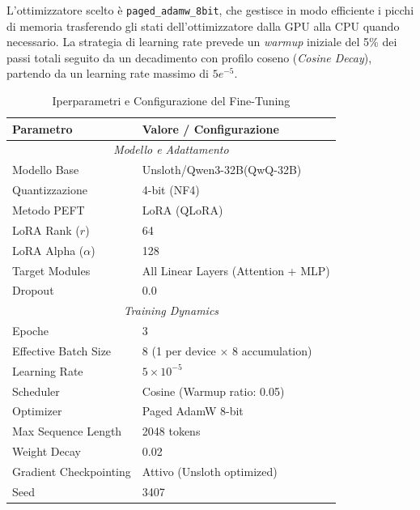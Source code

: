 L'ottimizzatore scelto è \texttt{paged\_adamw\_8bit}, che gestisce in modo efficiente i picchi di memoria trasferendo gli stati dell'ottimizzatore dalla GPU alla CPU quando necessario. La strategia di learning rate prevede un \textit{warmup} iniziale del 5\% dei passi totali seguito da un decadimento con profilo coseno (\textit{Cosine Decay}), partendo da un learning rate massimo di $5e^{-5}$.

\begin{table}[!h]
    \centering
    \renewcommand{\arraystretch}{1.2}
    \begin{tabular}{|l|l|}
        \hline
        \textbf{Parametro} & \textbf{Valore / Configurazione} \\
        \hline
        \hline
        \multicolumn{2}{|c|}{\textit{Modello e Adattamento}} \\
        \hline
        Modello Base & Unsloth/Qwen3-32B(QwQ-32B) \\
        Quantizzazione & 4-bit (NF4) \\
        Metodo PEFT & LoRA (QLoRA) \\
        LoRA Rank ($r$) & 64 \\
        LoRA Alpha ($\alpha$) & 128 \\
        Target Modules & All Linear Layers (Attention + MLP) \\
        Dropout & 0.0 \\
        \hline
        \multicolumn{2}{|c|}{\textit{Training Dynamics}} \\
        \hline
        Epoche & 3 \\
        Effective Batch Size & 8 (1 per device $\times$ 8 accumulation) \\
        Learning Rate & $5 \times 10^{-5}$ \\
        Scheduler & Cosine (Warmup ratio: 0.05) \\
        Optimizer & Paged AdamW 8-bit \\
        Max Sequence Length & 2048 tokens \\
        Weight Decay & 0.02 \\
        Gradient Checkpointing & Attivo (Unsloth optimized) \\
        Seed & 3407 \\
        \hline
        
    \end{tabular}
    \caption{Iperparametri e Configurazione del Fine-Tuning}
    \label{fig:hyperparameters}
\end{table}

